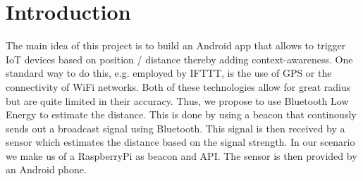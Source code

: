 \documentclass[
10pt, %
a4paper, %
oneside, %
headinclude,footinclude, %
BCOR5mm, %
]{scrartcl}
\begin{document}




\section{Introduction}
The main idea of this project is to build an Android app that allows to trigger IoT devices based on position / distance thereby adding context-awareness. One standard way to do this, e.g. employed by IFTTT, is the use of GPS or the connectivity of WiFi networks. Both of these technologies allow for great radius but are quite limited in their accuracy. Thus, we propose to use Bluetooth Low Energy to estimate the distance. This is done by using a beacon that continously sends out a broadcast signal using Bluetooth. This signal is then received by a sensor which estimates the distance based on the signal strength. In our scenario we make us of a RaspberryPi as beacon and API. The sensor is then provided by an Android phone.
\end{document}
